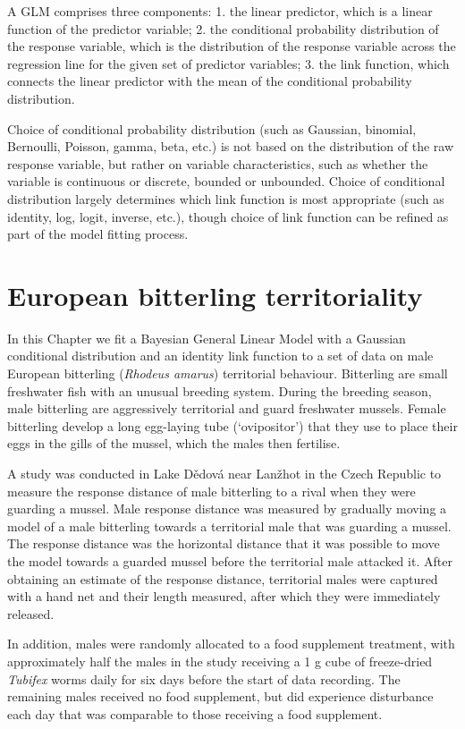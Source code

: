 \documentclass[
]{book}
\begin{document}
A GLM comprises three components: 1. the linear predictor, which is a linear function of the predictor variable; 2. the conditional probability distribution of the response variable, which is the distribution of the response variable across the regression line for the given set of predictor variables; 3. the link function, which connects the linear predictor with the mean of the conditional probability distribution.

Choice of conditional probability distribution (such as Gaussian, binomial, Bernoulli, Poisson, gamma, beta, etc.) is not based on the distribution of the raw response variable, but rather on variable characteristics, such as whether the variable is continuous or discrete, bounded or unbounded. Choice of conditional distribution largely determines which link function is most appropriate (such as identity, log, logit, inverse, etc.), though choice of link function can be refined as part of the model fitting process.

\hypertarget{bitterling}{%
\section{European bitterling territoriality}\label{bitterling}}

In this Chapter we fit a Bayesian General Linear Model with a Gaussian conditional distribution and an identity link function to a set of data on male European bitterling (\emph{Rhodeus amarus}) territorial behaviour. Bitterling are small freshwater fish with an unusual breeding system. During the breeding season, male bitterling are aggressively territorial and guard freshwater mussels. Female bitterling develop a long egg-laying tube (`ovipositor') that they use to place their eggs in the gills of the mussel, which the males then fertilise.

A study was conducted in Lake Dědová near Lanžhot in the Czech Republic to measure the response distance of male bitterling to a rival when they were guarding a mussel. Male response distance was measured by gradually moving a model of a male bitterling towards a territorial male that was guarding a mussel. The response distance was the horizontal distance that it was possible to move the model towards a guarded mussel before the territorial male attacked it. After obtaining an estimate of the response distance, territorial males were captured with a hand net and their length measured, after which they were immediately released.

In addition, males were randomly allocated to a food supplement treatment, with approximately half the males in the study receiving a 1 g cube of freeze-dried \emph{Tubifex} worms daily for six days before the start of data recording. The remaining males received no food supplement, but did experience disturbance each day that was comparable to those receiving a food supplement.
\end{document}
